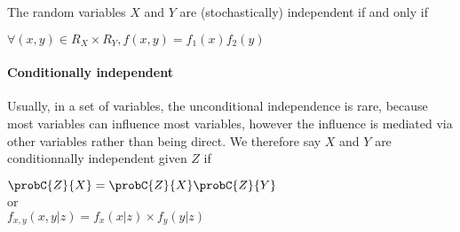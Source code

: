 The random variables $X$ and $Y$ are (stochastically) independent if and only if
\begin{center}
	$\forall (x,y)\in R_{X}\times R_{Y}, f(x,y)=f_{1}(x)f_{2}(y)$
\end{center}

\paragraph{Conditionally independent}
Usually, in a set of variables, the unconditional independence is rare, because most 
variables can influence most variables, however the influence is mediated via other 
variables rather than being direct. We therefore say $X$ and $Y$ are conditionnally
independent given $Z$ if
\begin{center}
	$\probC{Z}{X} = \probC{Z}{X}\probC{Z}{Y}$\\
	or\\
	$f_{x,y}(x,y|z) = f_{x}(x|z)\times f_{y}(y|z)$
\end{center}
